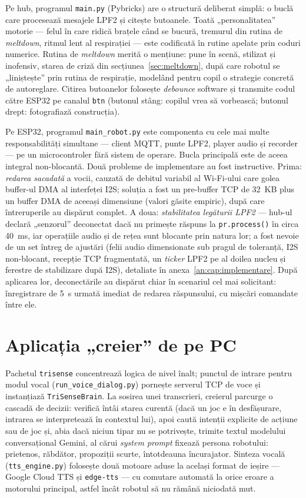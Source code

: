 Pe hub, programul \texttt{main.py} (Pybricks) are o structură deliberat simplă: o buclă care procesează mesajele LPF2 și citește butoanele. Toată „personalitatea” motorie — felul în care ridică brațele când se bucură, tremurul din rutina de \emph{meltdown}, ritmul lent al respirației — este codificată în rutine apelate prin coduri numerice. Rutina de \emph{meltdown} merită o mențiune: pune în scenă, stilizat și inofensiv, starea de criză din secțiunea~\ref{sec:meltdown}, după care robotul se „liniștește” prin rutina de respirație, modelând pentru copil o strategie concretă de autoreglare. Citirea butoanelor folosește \emph{debounce} software și transmite codul către ESP32 pe canalul \texttt{btn} (butonul stâng: copilul vrea să vorbească; butonul drept: fotografiază construcția).

Pe ESP32, programul \texttt{main\_robot.py} este componenta cu cele mai multe responsabilități simultane — client MQTT, punte LPF2, player audio și recorder — pe un microcontroler fără sistem de operare. Bucla principală este de aceea integral non-blocantă. Două probleme de implementare au fost instructive. Prima: \emph{redarea sacadată} a vocii, cauzată de debitul variabil al Wi-Fi-ului care golea buffer-ul DMA al interfeței I2S; soluția a fost un pre-buffer TCP de 32~KB plus un buffer DMA de aceeași dimensiune (valori găsite empiric), după care întreruperile au dispărut complet. A doua: \emph{stabilitatea legăturii LPF2} — hub-ul declară „senzorul” deconectat dacă nu primește răspuns la \texttt{pr.process()} în circa 40~ms, iar operațiile audio și de rețea sunt blocante prin natura lor; a fost nevoie de un set întreg de ajustări (felii audio dimensionate sub pragul de toleranță, I2S non-blocant, recepție TCP fragmentată, un \emph{ticker} LPF2 pe al doilea nucleu și ferestre de stabilizare după I2S), detaliate în anexa~\ref{an:cap:implementare}. După aplicarea lor, deconectările au dispărut chiar în scenariul cel mai solicitant: înregistrare de 5~s urmată imediat de redarea răspunsului, cu mișcări comandate între ele.

\section{Aplicația „creier” de pe PC}

Pachetul \texttt{trisense} concentrează logica de nivel înalt; punctul de intrare pentru modul vocal (\texttt{run\_voice\_dialog.py}) pornește serverul TCP de voce și instanțiază \texttt{TriSenseBrain}. La sosirea unei transcrieri, creierul parcurge o cascadă de decizii: verifică întâi starea curentă (dacă un joc e în desfășurare, intrarea se interpretează în contextul lui), apoi caută intenții explicite de acțiune sau de joc și, abia dacă niciun tipar nu se potrivește, trimite textul modelului conversațional Gemini, al cărui \emph{system prompt} fixează persona robotului: prietenos, răbdător, propoziții scurte, întotdeauna încurajator. Sinteza vocală (\texttt{tts\_engine.py}) folosește două motoare aduse la același format de ieșire — Google Cloud TTS și \texttt{edge-tts} — cu comutare automată la orice eroare a motorului principal, astfel încât robotul să nu rămână niciodată mut.

